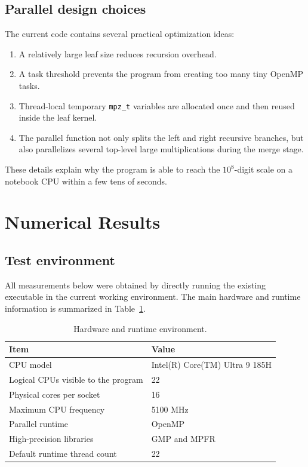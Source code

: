 \documentclass[12pt,a4paper]{article}
\begin{document}
\subsection{Parallel design choices}

The current code contains several practical optimization ideas:
\begin{enumerate}[label=(\arabic*)]
    \item A relatively large leaf size reduces recursion overhead.
    \item A task threshold prevents the program from creating too many tiny OpenMP tasks.
    \item Thread-local temporary \texttt{mpz\_t} variables are allocated once and then reused inside the leaf kernel.
    \item The parallel function not only splits the left and right recursive branches, but also parallelizes several top-level large multiplications during the merge stage.
\end{enumerate}

These details explain why the program is able to reach the $10^8$-digit scale on a notebook CPU within a few tens of seconds.

\section{Numerical Results}

\subsection{Test environment}

All measurements below were obtained by directly running the existing executable in the current working environment. The main hardware and runtime information is summarized in Table~\ref{tab:env}.

\begin{table}[H]
\centering
\caption{Hardware and runtime environment.}
\label{tab:env}
\begin{tabular}{ll}
\toprule
Item & Value \\
\midrule
CPU model & Intel(R) Core(TM) Ultra 9 185H \\
Logical CPUs visible to the program & 22 \\
Physical cores per socket & 16 \\
Maximum CPU frequency & 5100 MHz \\
Parallel runtime & OpenMP \\
High-precision libraries & GMP and MPFR \\
Default runtime thread count & 22 \\
\bottomrule
\end{tabular}
\end{table}
\end{document}
